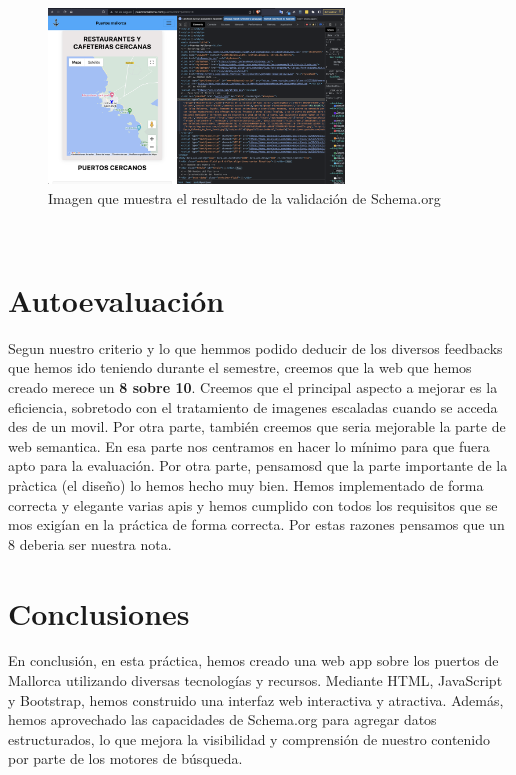 \documentclass{article}
\begin{document}
\begin{figure}[ht]
    \centering
    \includegraphics[width=0.7\textwidth]{images/webSBe.png}
    \caption{Imagen que muestra el resultado de la validación de Schema.org}
\end{figure}\\

\section{Autoevaluación}
Segun nuestro criterio y lo que hemmos podido deducir de los diversos feedbacks que hemos ido teniendo durante el semestre, creemos que la web que hemos creado merece un \textbf{8 sobre 10}. Creemos que el principal aspecto a mejorar es la eficiencia, sobretodo con el tratamiento de imagenes escaladas cuando se acceda des de un movil. Por otra parte, también creemos que seria mejorable la parte de web semantica. En esa parte nos centramos en hacer lo mínimo para que fuera apto para la evaluación. Por otra parte, pensamosd que la parte importante de la pràctica (el diseño) lo hemos hecho muy bien. Hemos implementado de forma correcta y elegante varias apis y hemos cumplido con todos los requisitos que se mos exigían en la práctica de forma correcta. Por estas razones pensamos que un 8 deberia ser nuestra nota.

\section{Conclusiones}
En conclusión, en esta práctica, hemos creado una web app sobre los puertos de Mallorca utilizando diversas tecnologías y recursos. Mediante HTML, JavaScript y Bootstrap, hemos construido una interfaz web interactiva y atractiva. Además, hemos aprovechado las capacidades de Schema.org para agregar datos estructurados, lo que mejora la visibilidad y comprensión de nuestro contenido por parte de los motores de búsqueda.\\
\end{document}
